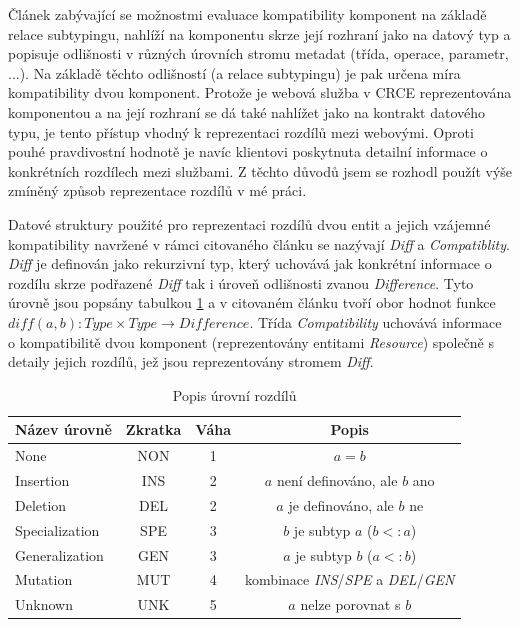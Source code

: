 \documentclass[czech,DP]{thesiskiv}
\begin{document}
Článek \cite{brada2006diff} zabývající se možnostmi evaluace kompatibility komponent na základě relace subtypingu, nahlíží na komponentu skrze její rozhraní jako na datový typ a popisuje odlišnosti v různých úrovních stromu metadat (třída, operace, parametr, ...). Na základě těchto odlišností (a relace subtypingu) je pak určena míra kompatibility dvou komponent. Protože je webová služba v CRCE reprezentována komponentou a na její rozhraní se dá také nahlížet jako na kontrakt datového typu, je tento přístup vhodný k reprezentaci rozdílů mezi webovými. Oproti pouhé pravdivostní hodnotě je navíc klientovi poskytnuta detailní informace o konkrétních rozdílech mezi službami. Z těchto důvodů jsem se rozhodl použít výše zmíněný způsob reprezentace rozdílů v mé práci. 

Datové struktury použité pro reprezentaci rozdílů dvou entit a jejich vzájemné kompatibility navržené v rámci citovaného článku se nazývají \textit{Diff} a \textit{Compatiblity}. \textit{Diff} je definován jako rekurzivní typ, který uchovává jak konkrétní informace o rozdílu skrze podřazené \textit{Diff} tak i úroveň odlišnosti zvanou \textit{Difference}. Tyto úrovně jsou popsány tabulkou \ref{tab:diffs} a v citovaném článku tvoří obor hodnot funkce $diff(a,b): Type \times Type \rightarrow Difference$. Třída \textit{Compatibility} uchovává informace o kompatibilitě dvou komponent (reprezentovány entitami \textit{Resource}) společně s detaily jejich rozdílů, jež jsou reprezentovány stromem \textit{Diff}.

\begin{table}[h]
	\centering
	\begin{tabular}{|l|c|c|c|}
		\hline
		Název úrovně & Zkratka & Váha & Popis \\
		\hline
		\hline
		None & NON & 1 & $a = b$ \\
		\hline
		Insertion & INS & 2 & $a$ není definováno, ale $b$ ano \\
		\hline
		Deletion & DEL & 2 & $a$ je definováno, ale $b$ ne \\
		\hline
		Specialization & SPE & 3 & $b$ je subtyp $a$ ($b <: a$) \\
		\hline
		Generalization & GEN & 3& $a$ je subtyp $b$ ($a <: b$) \\
		\hline
		Mutation & MUT & 4 & kombinace \textit{INS}/\textit{SPE} a \textit{DEL}/\textit{GEN} \\
		\hline
		Unknown & UNK & 5 & $a$ nelze porovnat s $b$ \\
		\hline
	\end{tabular}
	\caption{Popis úrovní rozdílů}
	\label{tab:diffs}
\end{table} 
\end{document}
